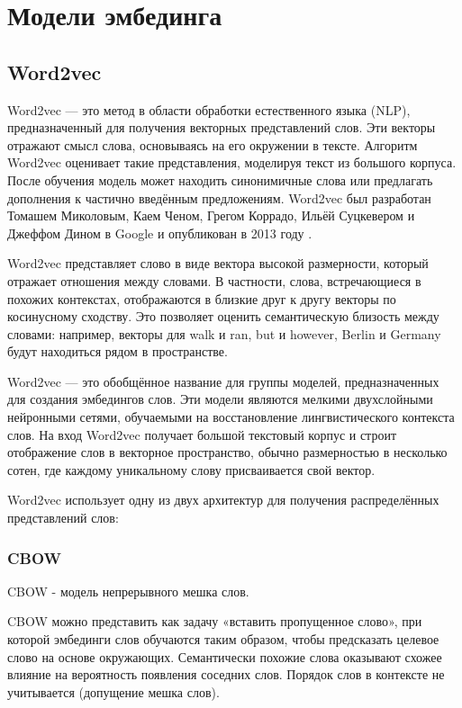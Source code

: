 \section{Модели эмбединга}
\subsection{Word2vec}

Word2vec — это метод в области обработки естественного языка (NLP), предназначенный для получения векторных представлений слов. Эти векторы отражают смысл слова, основываясь на его окружении в тексте. Алгоритм Word2vec оценивает такие представления, моделируя текст из большого корпуса. После обучения модель может находить синонимичные слова или предлагать дополнения к частично введённым предложениям. Word2vec был разработан Томашем Миколовым, Каем Ченом, Грегом Коррадо, Ильёй Суцкевером и Джеффом Дином в Google и опубликован в 2013 году .

Word2vec представляет слово в виде вектора высокой размерности, который отражает отношения между словами. В частности, слова, встречающиеся в похожих контекстах, отображаются в близкие друг к другу векторы по косинусному сходству. Это позволяет оценить семантическую близость между словами: например, векторы для walk и ran, but и however, Berlin и Germany будут находиться рядом в пространстве.

Word2vec — это обобщённое название для группы моделей, предназначенных для создания эмбедингов слов. Эти модели являются мелкими двухслойными нейронными сетями, обучаемыми на восстановление лингвистического контекста слов. На вход Word2vec получает большой текстовый корпус и строит отображение слов в векторное пространство, обычно размерностью в несколько сотен, где каждому уникальному слову присваивается свой вектор.

Word2vec использует одну из двух архитектур для получения распределённых представлений слов:

\subsubsection{CBOW}
CBOW - модель непрерывного мешка слов.

CBOW можно представить как задачу «вставить пропущенное слово», при которой эмбединги слов обучаются таким образом, чтобы предсказать целевое слово на основе окружающих. Семантически похожие слова оказывают схожее влияние на вероятность появления соседних слов. Порядок слов в контексте не учитывается (допущение мешка слов).

